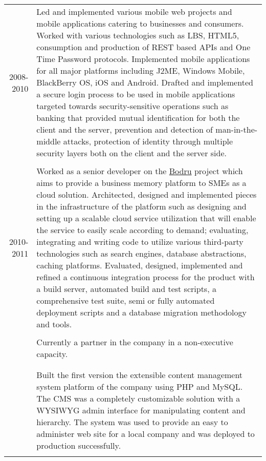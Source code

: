 \documentclass[a4paper,10pt]{article}
\newcommand{\exptitle}[2]{
  \multicolumn{2}{l}{\textsc{#1} \footnotesize{#2}} \\
  \specialrule{.01em}{0.5em}{1em}
}
\begin{document}
\begin{longtable}{r|p{11cm}}
  \textsc{2008-2010}            & Led and implemented various mobile web projects and mobile applications catering to businesses and consumers. Worked with various technologies such as LBS, HTML5, consumption and production of REST based APIs and One Time Password protocols. Implemented mobile applications for all major platforms including J2ME, Windows Mobile, BlackBerry OS, iOS and Android. Drafted and implemented a secure login process to be used in mobile applications targeted towards security-sensitive operations such as banking that provided mutual identification for both the client and the server, prevention and detection of man-in-the-middle attacks, protection of identity through multiple security layers both on the client and the server side. \\
  \multicolumn{2}{c}{} \\


  \textsc{2010-2011}            & Worked as a senior developer on the \href{http://www.bodru.com}{Bodru} project which aims to provide a business memory platform to SMEs as a cloud solution. Architected, designed and implemented pieces in the infrastructure of the platform such as designing and setting up a scalable cloud service utilization that will enable the service to easily scale according to demand; evaluating, integrating and writing code to utilize various third-party technologies such as search engines, database abstractions, caching platforms. Evaluated, designed, implemented and refined a continuous integration process for the product with a build server, automated build and test scripts, a comprehensive test suite, semi or fully automated deployment scripts and a database migration methodology and tools. \\
  \multicolumn{2}{c}{} \\

                                & Currently a partner in the company in a non-executive capacity. \\
  \multicolumn{2}{c}{} \\

  \newpage

  \exptitle{Parkyeri}{Aug 2001 - Jan 2002}

                                & Built the first version the extensible content management system platform of the company using PHP and MySQL. The CMS was a completely customizable solution with a WYSIWYG admin interface for manipulating content and hierarchy. The system was used to provide an easy to administer web site for a local company and was deployed to production successfully. \\
  \multicolumn{2}{c}{} \\



\end{longtable}
\end{document}
